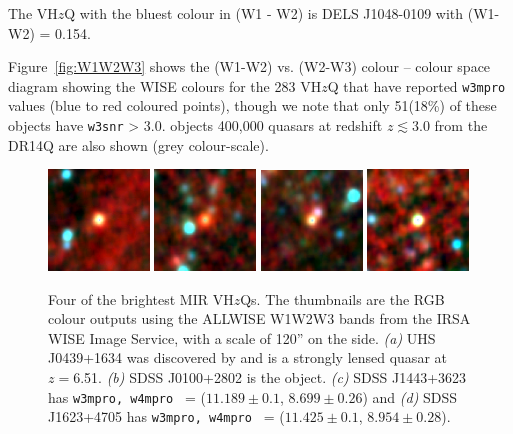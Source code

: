 \documentclass[usenatbib]{mnras}
\begin{document}
The VH$z$Q with the bluest colour in (W1 - W2) is 
DELS J1048-0109 with (W1-W2) = 0.154. 

Figure~\ref{fig:W1W2W3} shows the (W1-W2) vs. (W2-W3) colour – colour space diagram showing the WISE colours for the 283 VH$z$Q that have reported {\tt w3mpro} values (blue to red coloured points), though we note that only 51(18\%) of these objects have {\tt w3snr} > 3.0.  objects  400,000 quasars
at redshift $z\lesssim3.0$ from the DR14Q are also shown (grey
colour-scale). 


\begin{figure}
    \centering
    \includegraphics[width=0.24\textwidth]{../data/WISE/image_thumbnails/UHS_J0439+1634.png} 
    \includegraphics[width=0.24\textwidth]{../data/WISE/image_thumbnails/SDSS_J1443+3623.png}
    \includegraphics[width=0.24\textwidth]{../data/WISE/image_thumbnails/SDSS_J1623+4705.png}
    \includegraphics[width=0.24\textwidth]{../data/WISE/image_thumbnails/SDSS_J0100+2802.png}
    \caption{Four of the brightest MIR VH$z$Qs. 
      The thumbnails are the RGB colour outputs using the ALLWISE W1W2W3 bands from the 
      IRSA WISE Image Service, with a scale of 120'' on the side. 
      {\it (a)} UHS J0439+1634 was discovered by
      \citet{Fan2019} and is a strongly lensed quasar at $z=$6.51. 
      {\it (b)} SDSS J0100+2802 is the \citet{Wu2015} object. 
      {\it (c)} SDSS J1443+3623 has {\tt w3mpro, w4mpro } = ($11.189\pm0.1$, $8.699\pm0.26$) and 
      {\it (d)} SDSS J1623+4705 has {\tt w3mpro, w4mpro } = ($11.425\pm0.1$, $8.954\pm0.28$).}
    \label{fig:VHzQ_W4s}
\end{figure}
\end{document}
